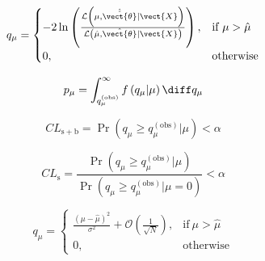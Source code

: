 \begin{equation}
q_{\mu} = 
\begin{cases}
  -2\ln\left(
  \frac
      {\mathcal{L} \left( \mu, \hat{\hat{\vect{\theta}}} \rvert \vect{X} \right)}
      {\mathcal{L} \left( \hat{\mu}, \hat{\vect{\theta}} \rvert \vect{X} \right)}
 \right), & \text{if}\ \mu > \hat{\mu} \\
      0, & \text{otherwise}
    \end{cases}
\end{equation}


\begin{equation}
p_{\mu} = \int_{q_{\mu}^{\left(\text{obs}\right)}}^{\infty} f\left(q_{\mu} \rvert \mu\right) \diff q_{\mu}
\end{equation}


\begin{equation}
  CL_\mathrm{s+b}  = \Pr\left( q_{\mu} \geq q_{\mu}^{\left(\text{obs}\right)}
  \rvert \mu
  \right) < \alpha
\end{equation}


\begin{equation}
  CL_\mathrm{s}  = \frac
  {\Pr\left( q_{\mu} \geq q_{\mu}^{\left(\text{obs}\right)}\rvert \mu \right)}
  {\Pr\left( q_{\mu} \geq q_{\mu}^{\left(\text{obs}\right)}\rvert \mu = 0 \right)}
< \alpha
\end{equation}


\begin{equation}
  q_{\mu} = 
  \begin{cases}
    \frac{\left(\mu - \hat{\mu}\right)^2}{\sigma^2} + \mathcal{O}\left(\frac{1}{\sqrt{N}}\right)
    , & \text{if}\ \mu > \hat{\mu} \\
    0, & \text{otherwise}
  \end{cases}
\end{equation}
